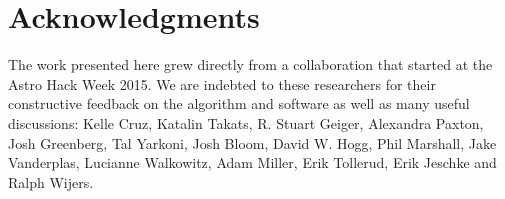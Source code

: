 \documentclass[10pt,letterpaper]{article}
\begin{document}
\section*{Acknowledgments}
The work presented here grew directly from a collaboration that started at the Astro Hack Week 2015. %
We are indebted to these researchers for their constructive feedback on the algorithm and software as well as many useful discussions: Kelle Cruz, Katalin Takats, R. Stuart Geiger, Alexandra Paxton, Josh Greenberg, Tal Yarkoni, Josh Bloom, David W. Hogg, Phil Marshall, Jake Vanderplas, Lucianne Walkowitz, Adam Miller, Erik Tollerud, Erik Jeschke and Ralph Wijers. \\
\end{document}
